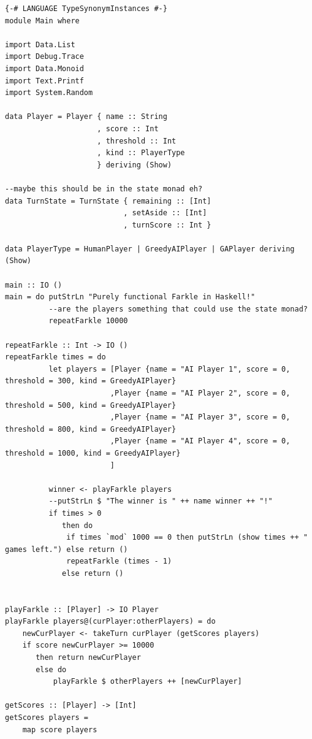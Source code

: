 \documentclass{article}
\begin{document}
\begin{verbatim}
{-# LANGUAGE TypeSynonymInstances #-}
module Main where

import Data.List
import Debug.Trace
import Data.Monoid
import Text.Printf
import System.Random

data Player = Player { name :: String
                     , score :: Int
                     , threshold :: Int
                     , kind :: PlayerType
                     } deriving (Show)

--maybe this should be in the state monad eh?
data TurnState = TurnState { remaining :: [Int]
                           , setAside :: [Int]
                           , turnScore :: Int }

data PlayerType = HumanPlayer | GreedyAIPlayer | GAPlayer deriving (Show)

main :: IO ()
main = do putStrLn "Purely functional Farkle in Haskell!"
          --are the players something that could use the state monad?
          repeatFarkle 10000

repeatFarkle :: Int -> IO ()
repeatFarkle times = do
          let players = [Player {name = "AI Player 1", score = 0, threshold = 300, kind = GreedyAIPlayer}
                        ,Player {name = "AI Player 2", score = 0, threshold = 500, kind = GreedyAIPlayer}
                        ,Player {name = "AI Player 3", score = 0, threshold = 800, kind = GreedyAIPlayer}
                        ,Player {name = "AI Player 4", score = 0, threshold = 1000, kind = GreedyAIPlayer}
                        ]

          winner <- playFarkle players
          --putStrLn $ "The winner is " ++ name winner ++ "!"
          if times > 0
             then do
              if times `mod` 1000 == 0 then putStrLn (show times ++ " games left.") else return ()
              repeatFarkle (times - 1)
             else return ()


playFarkle :: [Player] -> IO Player
playFarkle players@(curPlayer:otherPlayers) = do
    newCurPlayer <- takeTurn curPlayer (getScores players)
    if score newCurPlayer >= 10000
       then return newCurPlayer
       else do
           playFarkle $ otherPlayers ++ [newCurPlayer]

getScores :: [Player] -> [Int]
getScores players =
    map score players


\end{verbatim}
\end{document}
